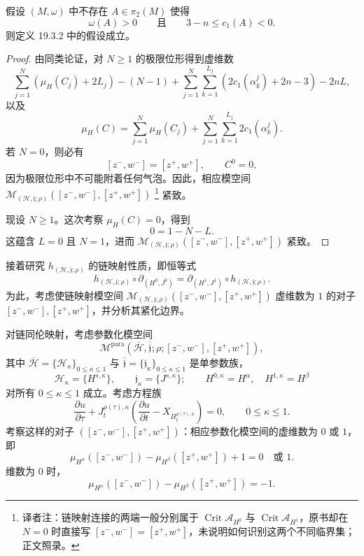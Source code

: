 \begin{theorem}
\label{thm:semipositive-chain-map-regularity}
假设 $(M,\omega)$ 中不存在 $A\in\pi_2(M)$ 使得
\[
 \omega(A)>0\qquad\text{且}\qquad3-n\leq c_1(A)<0.
\]
则定义 19.3.2 中的假设成立。
\end{theorem}

\begin{proof}
由同类论证，对 $N\geq1$ 的极限位形得到虚维数
\[
 \sum_{j=1}^{N}(\mu_H(C_j)+2L_j)-(N-1)
 +\sum_{j=1}^{N}\sum_{k=1}^{L_j}
 (2c_1(\alpha_k^j)+2n-3)-2nL,
\]
以及
\[
 \mu_H(C)=\sum_{j=1}^{N}\mu_H(C_j)
 +\sum_{j=1}^{N}\sum_{k=1}^{L_j}2c_1(\alpha_k^j).
\]
若 $N=0$，则必有
\[
 [z^-,w^-]=[z^+,w^+],\qquad C^0=0,
\]
因为极限位形中不可能附着任何气泡。因此，相应模空间
$\mathcal M_{(\mathcal H,\mathfrak j;\rho)}([z^-,w^-],[z^+,w^+])$
\footnote{译者注：链映射连接的两端一般分别属于
$\operatorname{Crit}\mathcal A_{H^0}$ 与
$\operatorname{Crit}\mathcal A_{H^1}$，原书却在 $N=0$ 时直接写
$[z^-,w^-]=[z^+,w^+]$，未说明如何识别这两个不同临界集；正文照录。}
紧致。

现设 $N\geq1$。这次考察 $\mu_H(C)=0$，得到
\[
 0=1-N-L.
\]
这蕴含 $L=0$ 且 $N=1$，进而
$\mathcal M_{(\mathcal H,\mathfrak j;\rho)}([z^-,w^-],[z^+,w^+])$ 紧致。
\end{proof}

接着研究 $h_{(\mathcal H,\mathfrak j;\rho)}$ 的链映射性质，即恒等式
\begin{equation}
 h_{(\mathcal H,\mathfrak j;\rho)}\circ\partial_{(H^0,J^0)}
 =\partial_{(H^1,J^1)}\circ h_{(\mathcal H,\mathfrak j;\rho)}.
\label{eq:19-chain-map-property}
\end{equation}
为此，考虑使链映射模空间
$\mathcal M_{(\mathcal H,\mathfrak j;\rho)}([z^-,w^-],[z^+,w^+])$ 虚维数为 $1$
的对子 $[z^-,w^-],[z^+,w^+]$，并分析其紧化边界。

对链同伦映射，考虑参数化模空间
\[
 \mathcal M^{\mathrm{para}}
 (\overline{\mathcal H},\overline{\mathfrak j};\rho;
 [z^-,w^-],[z^+,w^+]),
\]
其中
$\overline{\mathcal H}=\{\mathcal H_\kappa\}_{0\leq\kappa\leq1}$ 与
$\overline{\mathfrak j}=\{\mathfrak j_\kappa\}_{0\leq\kappa\leq1}$ 是单参数族，
\[
 \mathcal H_\kappa=\{H^{s,\kappa}\},\qquad
 \mathfrak j_\kappa=\{J^{s,\kappa}\};\qquad
 H^{0,\kappa}=H^\alpha,\quad H^{1,\kappa}=H^\beta
\]
对所有 $0\leq\kappa\leq1$ 成立。考虑方程族
\[
 \frac{\partial u}{\partial\tau}
 +J_t^{\rho(\tau),\kappa}
 \left(\frac{\partial u}{\partial t}-X_{H_t^{\rho(\tau),\kappa}}\right)=0,
 \qquad0\leq\kappa\leq1.
\]
考察这样的对子 $([z^-,w^-],[z^+,w^+])$：相应参数化模空间的虚维数为 $0$ 或
$1$，即
\[
 \mu_{H^\alpha}([z^-,w^-])-\mu_{H^\beta}([z^+,w^+])+1=0
 \quad\text{或 }1.
\]
维数为 $0$ 时，
\[
 \mu_{H^\alpha}([z^-,w^-])-\mu_{H^\beta}([z^+,w^+])=-1.
\]

